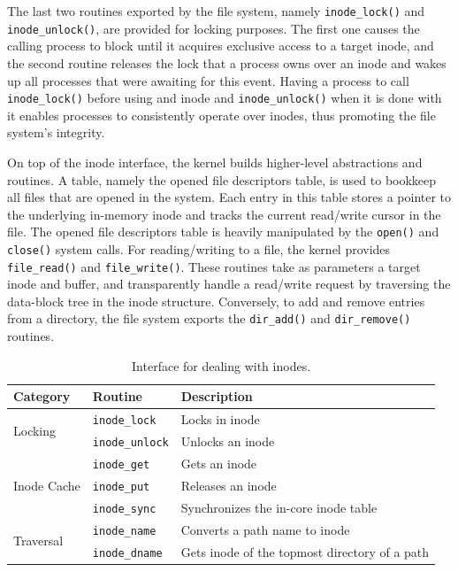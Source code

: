 		The last two routines exported by the file system, namely
		\texttt{inode\_lock()} and \texttt{inode\_unlock()}, are
		provided for locking purposes. The first one causes the calling
		process to block until it acquires exclusive access to a target
		inode, and the second routine releases the lock that a process
		owns over an inode and wakes up all processes that were awaiting
		for this event. Having a process to call \texttt{inode\_lock()}
		before using and inode and \texttt{inode\_unlock()} when it is
		done with it enables processes to consistently operate over
		inodes, thus promoting the file system's integrity.

		On top of the inode interface, the kernel builds higher-level
		abstractions and routines. A table, namely the opened file
		descriptors table, is used to bookkeep all files that are opened
		in the system. Each entry in this table stores a pointer to the
		underlying in-memory inode and tracks the current read/write
		cursor in the file. The opened file descriptors table is heavily
		manipulated by the \texttt{open()} and \texttt{close()} system
		calls. For reading/writing to a file, the kernel provides
		\texttt{file\_read()} and \texttt{file\_write()}. These routines
		take as parameters a target inode and buffer, and transparently
		handle a read/write request by traversing the data-block tree in
		the inode structure. Conversely, to add and remove entries from
		a directory, the file system exports the \texttt{dir\_add()} and
		\texttt{dir\_remove()} routines. 

		\begin{table}
		\small
		\centering
		\caption{Interface for dealing with inodes.}
		\label{table: inodes interface}
		\begin{tabular}{l l l}
			\toprule
			Category & Routine & Description \\
			\midrule
			\multirow{2}{*}{Locking}
										   & \texttt{inode\_lock}     & Locks in inode                                \\
										   & \texttt{inode\_unlock}   & Unlocks an inode                              \\
			\midrule
			\multirow{3}{*}{Inode Cache}
										   & \texttt{inode\_get}      & Gets an inode                                  \\
										   & \texttt{inode\_put}      & Releases an inode                              \\
										   & \texttt{inode\_sync}     & Synchronizes the in-core inode table           \\
			\midrule
			\multirow{2}{*}{Traversal}
										   & \texttt{inode\_name}     & Converts a path name to inode                  \\
										   & \texttt{inode\_dname}    & Gets inode of the topmost directory of a path  \\
			\bottomrule
		\end{tabular}
		\end{table}


